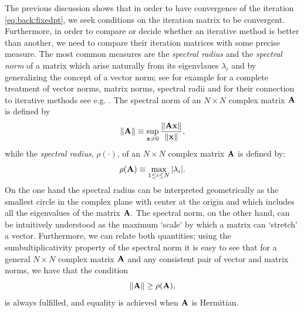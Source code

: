 The previous discussion shows that in order to have convergence of the iteration \eqref{eq:back:fixedpt}, we seek conditions on the iteration matrix to be convergent. Furthermore, in order to compare or decide whether an iterative method is better than another, we need to compare their iteration matrices with some precise measure. The most common measures are the \emph{spectral radius} and the \emph{spectral norm} of a matrix which arise naturally from its eigenvlaues $\lambda_i$ and by generalizing the concept of a vector norm; see for example \cite{HorJoh91} for a complete treatment of vector norms, matrix norms, spectral radii and for their connection to iterative methods see e.g. \cite{Ste01}. The spectral norm of an $N\times N$ complex matrix $\mathbf{A}$ is defined by
\begin{equation*}
\|\mathbf{A}\|\equiv\sup_{\mathbf{x}\neq 0}\frac{\|\mathbf{A}\mathbf{x}\|}{\|\mathbf{x}\|},
\end{equation*}
while the \emph{spectral radius}, $\rho(\cdot)$, of an $N\times N$ complex matrix $\mathbf{A}$ is defined by:
\begin{equation*}
\rho(\mathbf{A})\equiv\max_{1\leq i\leq N}|\lambda_i|.
\end{equation*}
On the one hand the spectral radius can be interpreted geometrically as the smallest circle in the complex plane with center at the origin and which includes all the eigenvalues of the matrix $\mathbf{A}$. The spectral norm, on the other hand, can be intuitively understood as the maximum `scale' by which a matrix can `stretch' a vector. Furthermore, we can relate both quantities; using the sumbultiplicativity property of the spectral norm it is easy to see that for a general $N\times N$ complex matrix $\mathbf{A}$ and any consistent pair of vector and matrix norms, we have that the condition
\begin{equation*}
\|\mathbf{A}\|\geq \rho(\mathbf{A}),
\label{eq:back:norm_and_rad}
\end{equation*}
is always fulfilled, and equality is achieved when $\mathbf{A}$ is Hermitian.


